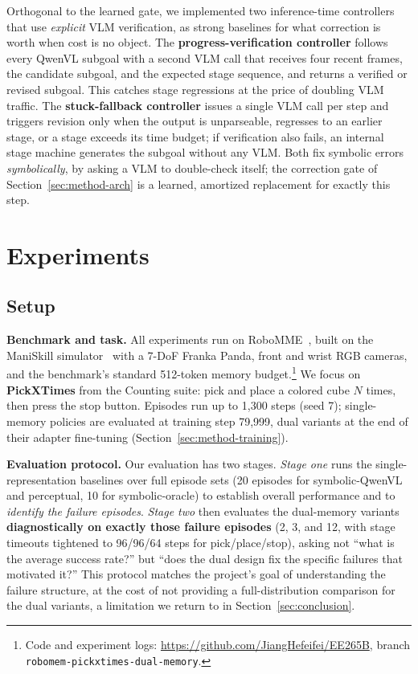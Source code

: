 \documentclass{article}
\begin{document}
Orthogonal to the learned gate, we implemented two inference-time controllers that use \emph{explicit} VLM verification, as strong baselines for what correction is worth when cost is no object. The \textbf{progress-verification controller} follows every QwenVL subgoal with a second VLM call that receives four recent frames, the candidate subgoal, and the expected stage sequence, and returns a verified or revised subgoal. This catches stage regressions at the price of doubling VLM traffic. The \textbf{stuck-fallback controller} issues a single VLM call per step and triggers revision only when the output is unparseable, regresses to an earlier stage, or a stage exceeds its time budget; if verification also fails, an internal stage machine generates the subgoal without any VLM. Both fix symbolic errors \emph{symbolically}, by asking a VLM to double-check itself; the correction gate of Section~\ref{sec:method-arch} is a learned, amortized replacement for exactly this step.

\section{Experiments}
\label{sec:experiments}

\subsection{Setup}
\label{sec:exp-setup}

\textbf{Benchmark and task.} All experiments run on RoboMME~\cite{robomme2026}, built on the ManiSkill simulator~\cite{maniskill3} with a 7-DoF Franka Panda, front and wrist RGB cameras, and the benchmark's standard 512-token memory budget.\footnote{Code and experiment logs: \url{https://github.com/JiangHefeifei/EE265B}, branch \texttt{robomem-pickxtimes-dual-memory}.} We focus on \textbf{PickXTimes} from the Counting suite: pick and place a colored cube $N$ times, then press the stop button. Episodes run up to 1{,}300 steps (seed 7); single-memory policies are evaluated at training step 79{,}999, dual variants at the end of their adapter fine-tuning (Section~\ref{sec:method-training}).

\textbf{Evaluation protocol.} Our evaluation has two stages. \emph{Stage one} runs the single-representation baselines over full episode sets (20 episodes for symbolic-QwenVL and perceptual, 10 for symbolic-oracle) to establish overall performance and to \emph{identify the failure episodes}. \emph{Stage two} then evaluates the dual-memory variants \textbf{diagnostically on exactly those failure episodes} (2, 3, and 12, with stage timeouts tightened to 96/96/64 steps for pick/place/stop), asking not ``what is the average success rate?'' but ``does the dual design fix the specific failures that motivated it?'' This protocol matches the project's goal of understanding the failure structure, at the cost of not providing a full-distribution comparison for the dual variants, a limitation we return to in Section~\ref{sec:conclusion}.
\end{document}
